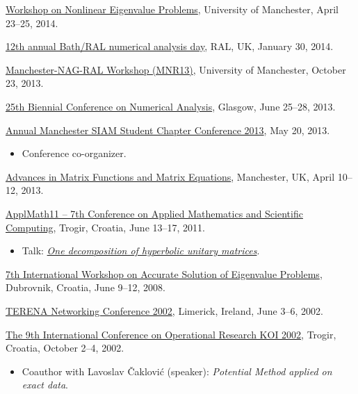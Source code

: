 \documentclass[10pt]{article}
\begin{document}
\begin{bibenum}
    \item \href{http://www.mims.manchester.ac.uk/events/workshops/NEP14/}{Workshop on Nonlinear Eigenvalue Problems}, University of Manchester, April 23--25, 2014.

    \item \href{http://www.numerical.rl.ac.uk/bath-ral/}{12th annual Bath/RAL numerical analysis day}, RAL, UK, January 30, 2014.

    \item \href{http://www.mims.manchester.ac.uk/events/workshops/MNR13/}{Manchester-NAG-RAL Workshop (MNR13)}, University of Manchester, October 23, 2013.

    \item \href{http://numericalanalysisconference.org.uk/}{25th Biennial Conference on Numerical Analysis}, Glasgow, June 25--28, 2013.

    \item \href{http://www.maths.manchester.ac.uk/~siam/amsscc13.php}{Annual Manchester SIAM Student Chapter Conference 2013}, May 20, 2013.
        \begin{itemize}
        \item Conference co-organizer.
        \end{itemize}

    \item \href{http://www.mims.manchester.ac.uk/events/workshops/FUN13/}{Advances in Matrix Functions and Matrix Equations}, Manchester, UK, April 10--12, 2013.

    \item \href{http://applmath11.math.hr/}{ApplMath11 -- 7th Conference on Applied Mathematics and Scientific Computing}, Trogir, Croatia, June 13--17, 2011.
    \begin{itemize}
    \item Talk: \href{http://viveka.math.hr/~vsego/talk/applmath11}{\emph{One decomposition of hyperbolic unitary matrices}}.
    \end{itemize}

    \item \href{http://lavica.fesb.hr/iwasep7/}{7th International Workshop on Accurate Solution of Eigenvalue Problems}, Du\-brov\-nik, Croatia, June 9--12, 2008.

    \item \href{http://tnc2002.terena.org/}{TERENA Networking Conference 2002}, Limerick, Ireland, June 3--6, 2002.

    \item \href{http://www.mathos.unios.hr/koi2004/about2002.htm}{The 9th International Conference on Operational Research KOI 2002}, Trogir, Croatia, October 2--4, 2002.
    \begin{itemize}
    \item Coauthor with Lavoslav Čaklović (speaker): \emph{Potential Method applied on exact data}.
    \end{itemize}


\end{bibenum}
\end{document}
